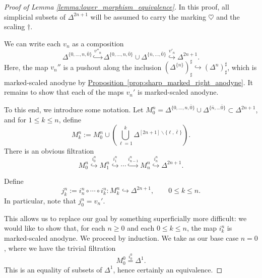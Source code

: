 \documentclass[main.tex]{subfiles}
\begin{document}
\begin{proof}[Proof of Lemma \ref{lemma:lower_morphism_equivalence}]
  In this proof, all simplicial subsets of $\Delta^{2n+1}$ will be assumed to carry the marking $\heartsuit$ and the scaling $\dagger$.

  We can write each $v_{n}$ as a composition
  \begin{equation*}
    \Delta^{\{0, \ldots, n, \overline{0}\}} \overset{v''_{n}}{\hookrightarrow} \Delta^{\{0, \ldots, n, \overline{0}\}} \cup \Delta^{\{\overline{n}, \ldots, \overline{0}\}} \overset{v'_{n}}{\hookrightarrow} \Delta^{2n+1}.
  \end{equation*}
  Here, the map $v_{n}''$ is a pushout along the inclusion $(\Delta^{\{n\}})^{\sharp}_{\sharp} \hookrightarrow (\Delta^{n})^{\sharp}_{\sharp}$, which is marked-scaled anodyne by \hyperref[prop:sharp_marked_right_anodyne]{Proposition~\ref*{prop:sharp_marked_right_anodyne}}. It remains to show that each of the maps $v_{n}'$ is marked-scaled anodyne.

  To this end, we introduce some notation. Let $M^{n}_{0} = \Delta^{\{0, \ldots, n, \overline{0}\}} \cup \Delta^{\{\overline{n}, \ldots \overline{0}\}} \subset \Delta^{2n+1}$, and for $1 \leq k \leq n$, define
  \begin{equation*}
    M^{n}_{k} := M^{n}_{0} \cup \left(\bigcup_{\ell = 1}^{k} \Delta^{[2n+1] \smallsetminus \{\ell, \overline{\ell}\}}\right).
  \end{equation*}
  There is an obvious filtration
  \begin{equation}
    \label{eq:filtration_by_adding_sides}
    M^{n}_{0} \overset{i^{n}_{0}}{\hookrightarrow} M^{n}_{1} \overset{i^{n}_{1}}{\hookrightarrow} \cdots \overset{i^{n}_{n-1}}{\hookrightarrow} M^{n}_{n} \overset{i^{n}_{n}}{\hookrightarrow} \Delta^{2n+1}.
  \end{equation}

  Define
  \begin{equation*}
    j^{n}_{k} := i^{n}_{n} \circ \cdots \circ i^{n}_{k}\colon M^{n}_{k} \hookrightarrow \Delta^{2n+1},\qquad 0 \leq k \leq n.
  \end{equation*}
  In particular, note that $j^{n}_{0} = v_{n}'$.

  This allows us to replace our goal by something superficially more difficult: we would like to show that, for each $n \geq 0$ and each $0 \leq k \leq n$, the map $i^{n}_{k}$ is marked-scaled anodyne. We proceed by induction. We take as our base case $n=0$, where we have the trivial filtration
  \begin{equation*}
    M^{0}_{0} \overset{i^{0}_{0}}{=} \Delta^{1}.
  \end{equation*}
  This is an equality of subsets of $\Delta^{1}$, hence certainly an equivalence.


\end{proof}
\end{document}
